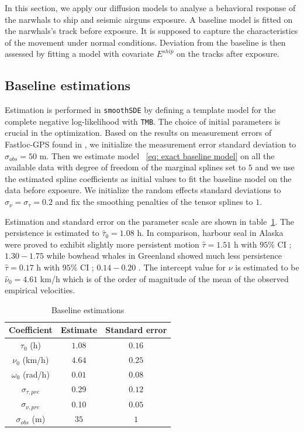 \documentclass[11pt]{article}
\newcommand {\1}{\mathbb{1}}
\theoremstyle{definition}
\theoremstyle{remark}
\theoremstyle{remark}
\begin{document}
In this section, we apply our diffusion models to analyse a behavioral response of the narwhals to ship and seismic airguns exposure.
A baseline model is fitted on the narwhals's track before exposure. It is supposed to capture the characteristics of the movement under normal conditions. Deviation from the baseline is then assessed by fitting a model with covariate $E^{ship}$ on the tracks after exposure.


\subsection{Baseline estimations}

Estimation is performed in \texttt{smoothSDE} by defining a template model for the complete negative  log-likelihood with \texttt{TMB}.  The choice of initial parameters is crucial in the optimization. Based on the results on measurement errors of Fastloc-GPS found in \cite{wensveen_path_2015}, we initialize the measurement error standard deviation to $\sigma_{obs}=50$ m. Then we estimate model ~\eqref{eq: exact baseline model} on all the available data with degree of freedom of the marginal splines set to $5$ and we use the estimated spline coefficients as initial values to fit the baseline model on the data before exposure. We initialize the random effects standard deviations to $\sigma_{\nu}=\sigma_{\tau}=0.2$ and fix the smoothing penalties of the tensor splines to $1$.

Estimation and standard error on the parameter scale are shown in table~\ref{table: baseline estimations}. 
The persistence is estimated to $\hat{\tau}_{0}=1.08 $ h.
In comparison, harbour seal in Alaska were proved to exhibit slightly more persistent motion $\hat{\tau}=1.51$ h with $95\%$ CI ; $1.30 -1.75$  \cite{johnson_continuoustime_2008} while bowhead whales in Greenland showed much less persistence $\hat{\tau}=0.17$ h with $95\%$ CI ; $0.14 -0.20$  \cite{gurarie_correlated_2017}.
The intercept value for $\nu$ is estimated to be $\hat{\nu}_{0}=4.61$ km/h which is of the order of magnitude of the mean of the observed empirical velocities.
\begin{table}[H]
	\centering
	\begin{tabular}{|c|c|c|}
		\hline
		Coefficient   & Estimate  & Standard error \\
		\hline
		$\tau_0$ (h)   & $1.08$    &  $0.16$ \\
		$\nu_0$ (km/h)  & $4.64$   &  $0.25$\\
		$\omega_0$ (rad/h)    & $0.01$    &  $0.08$ \\
		$\sigma_{\tau,pre}$    & 0.29   &  $0.12$ \\
		$\sigma_{\nu,pre}$    & 0.10   &  $0.05$ \\
		$\sigma_{obs}$ (m) & $35$ & $1$ \\
		\hline
	\end{tabular}
	\caption{Baseline estimations}
	\label{table: baseline estimations}
\end{table}
\end{document}

